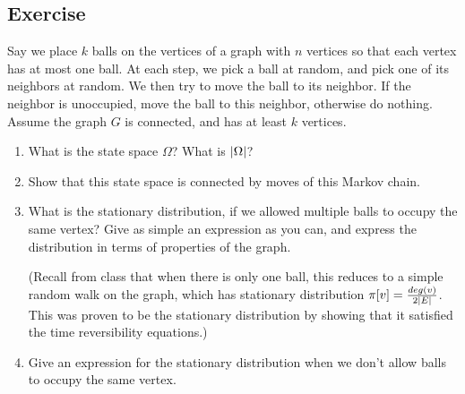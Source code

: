 \documentclass{article}
\newcounter{counter}
\newcommand{\Exercise}{Exercise \stepcounter{counter}\thecounter}
\DeclarePairedDelimiter\abs{\lvert}{\rvert}%
\begin{document}
\subsection*{\Exercise}
  Say we place $k$ balls on the vertices of a graph with $n$ vertices so
  that each vertex has at most one ball. At each step, we
  pick a ball at random, and pick one of its neighbors at random.
  We then try to move the ball to its neighbor. If the neighbor is
  unoccupied, move the ball to this neighbor, otherwise do nothing. Assume
  the graph $G$ is connected, and has at least $k$ vertices.
  \begin{enumerate}
    \item What is the state space $\Omega$? What is $\abs{\Omega}$?
    \item Show that this state space is connected by moves of this Markov
      chain.
    \item What is the stationary distribution, if we allowed multiple balls
      to occupy the same vertex?  Give as simple an expression as you can,
      and express the distribution in terms of properties of the graph.

      (Recall from class that when there is only one ball, this reduces to a
      simple random walk on the graph, which has stationary distribution
      $\pi[v] = \frac{deg(v)}{2\abs{E}}$. This was proven to be the
      stationary distribution by showing that it satisfied the time
      reversibility equations.)
    \item Give an expression for the stationary distribution when we don't
      allow balls to occupy the same vertex.
  \end{enumerate}

      
\end{document}
